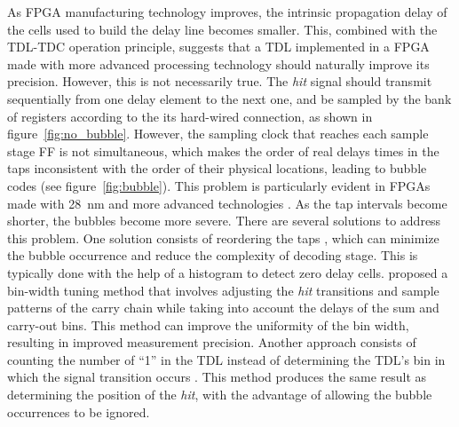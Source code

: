 As \gls{FPGA} manufacturing technology improves, the intrinsic propagation delay of the cells used to build the delay line becomes smaller. This, combined with the \gls{TDL}-\gls{TDC} operation principle, suggests that a \gls{TDL} implemented in a \gls{FPGA} made with more advanced processing technology should naturally improve its precision. However, this is not necessarily true. The \textit{hit} signal should transmit sequentially from one delay element to the next one, and be sampled by the bank of registers according to the its hard-wired connection, as shown in figure~\ref{fig:no_bubble}. However, the sampling clock that reaches each sample stage \gls{FF} is not simultaneous, which makes the order of real delays times in the taps inconsistent with the order of their physical locations, leading to bubble codes (see figure~\ref{fig:bubble}). This problem is particularly evident in \glspl{FPGA} made with 28~nm and more advanced technologies \citep{wu_first}. As the tap intervals become shorter, the bubbles become more severe. There are several solutions to address this problem. One solution consists of reordering the taps \citep{bin_realigment}, which can minimize the bubble occurrence and reduce the complexity of decoding stage. This is typically done with the help of a histogram to detect zero delay cells. \citet{tuned_line} proposed a bin-width tuning method that involves adjusting the \textit{hit} transitions and sample patterns of the carry chain while taking into account the delays of the sum and carry-out bins. This method can improve the uniformity of the bin width, resulting in improved measurement precision. Another approach consists of counting the number of “1” in the \gls{TDL} instead of determining the \gls{TDL}'s bin in which the signal transition occurs \citep{count_ones}. This method produces the same result as determining the position of the \textit{hit}, with the advantage of allowing the bubble occurrences to be ignored.

